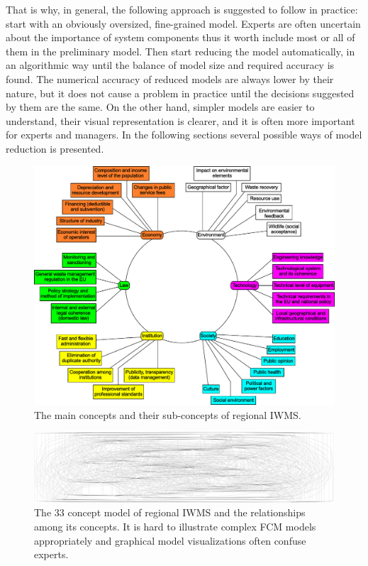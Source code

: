 \documentclass[graybox]{svmult}
\begin{document}
That is why, in general, the following approach is suggested to follow in practice: start with an obviously oversized, fine-grained model. Experts are often uncertain about the importance of system components thus it worth include most or all of them in the preliminary model. Then start reducing the model automatically, in an algorithmic way until the balance of model size and required accuracy is found. The numerical accuracy of reduced models are always lower by their nature, but it does not cause a problem in practice until the decisions suggested by them are the same. On the other hand, simpler models are easier to understand, their visual representation is clearer, and it is often more important for experts and managers. In the following sections several possible ways of model reduction is presented.

\begin{figure}[hbt]
  \begin{center}
    \includegraphics[width=\textwidth]{szines_virag.pdf}
  \end{center}
  \caption{The main concepts and their sub-concepts of regional IWMS.}
  \label{fig:flower}
\end{figure}

\begin{figure}[hbt]
  \begin{center}
    \includegraphics[width=\textwidth]{fcm_big.pdf}
  \end{center}
  \caption{The 33 concept model of regional IWMS and the relationships among its concepts. It is hard to illustrate complex FCM models appropriately and graphical model visualizations often confuse experts.}
  \label{fig:fcmbig}
\end{figure}
\end{document}
